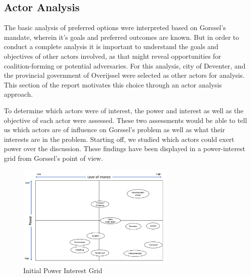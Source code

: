 \subsection{Actor Analysis}
The basic analysis of preferred options were interpreted based on Gorssel's mandate, wherein it's goals and preferred outcomes are known. But in order to conduct a complete analysis it is important to understand the goals and objectives of other actors involved, as that might reveal opportunities for coalition-forming or potential adversaries. For this analysis, city of Deventer, and the provincial government of Overijssel were selected as other actors for analysis. This section of the report motivates this choice through an actor analysis approach. 

\bigskip

To determine which actors were of interest, the power and interest as well as the objective of each actor were assessed. These two assessments would be able to tell us which actors are of influence on Gorssel's problem as well as what their interests are in the problem. Starting off, we studied which actors could exert power over the discussion. These findings have been displayed in a power-interest grid from Gorssel's point of view. \\

\begin{figure}[h]
    \centering
    \includegraphics[width=0.7\textwidth]{report/figures/PI grid.png}
    \caption{Initial Power Interest Grid}
    \label{fig:pi-grid}
\end{figure}



